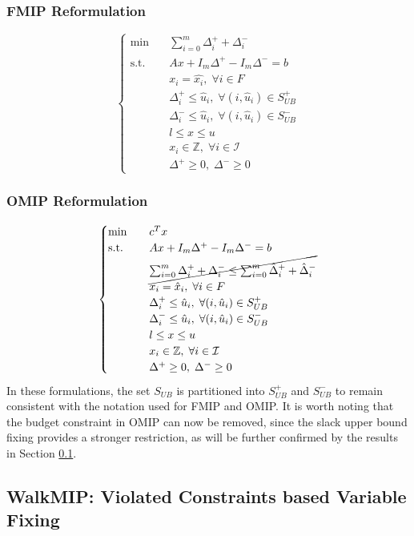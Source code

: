 \subsubsection{FMIP Reformulation}
\begin{equation}
\begin{cases}
\text{min} \quad & \sum_{i=0}^m \Delta_i^{+}+\Delta_i^{-} \\ 
\text{s.t.} \quad & Ax + I_m\Delta^+ - I_m\Delta^- = b\\ 
& x_i = \hat{x_i}, \; \forall i \in F\\ 
& \Delta^+_i \le \hat{u}_i, \; \forall (i,\hat{u}_i) \in S_{UB}^+\\
& \Delta^-_i \le \hat{u}_i, \; \forall (i,\hat{u}_i) \in S_{UB}^-\\  
& l \le x \le u\\ 
& x_i \in \mathbb{Z}, \; \forall i \in \mathcal{I} \\ 
& \Delta^+ \ge 0, \; \Delta^- \ge 0
\end{cases}
\end{equation}

\subsubsection{OMIP Reformulation}
\begin{equation}
\begin{cases}
\text{min} \quad & c^T x \\ 
\text{s.t.} \quad & Ax + I_m\Delta^+ - I_m\Delta^- = b\\
& \cancel{\sum_{i=0}^m \Delta_i^{+}+\Delta_i^{-} \le \sum_{i=0}^m \hat\Delta_i^{+}+\hat\Delta_i^{-}}\\ 
& x_i = \hat{x}_i, \; \forall i \in F\\ 
& \Delta^+_i \le \hat{u}_i, \; \forall (i,\hat{u}_i) \in S_{UB}^+\\
& \Delta^-_i \le \hat{u}_i, \; \forall (i,\hat{u}_i) \in S_{UB}^-\\  
& l \le x \le u\\ 
& x_i \in \mathbb{Z}, \; \forall i \in \mathcal{I} \\ 
& \Delta^+ \ge 0, \; \Delta^- \ge 0 
\end{cases}
\end{equation}
In these formulations, the set $S_{UB}$ is partitioned into $S_{UB}^+$ and $S_{UB}^-$ to remain consistent with the notation used for FMIP and OMIP.  
It is worth noting that the budget constraint in OMIP can now be removed, since the slack upper bound fixing provides a stronger restriction, as will be further confirmed by the results in Section \ref{}.  

\subsection{WalkMIP: Violated Constraints based Variable Fixing}
